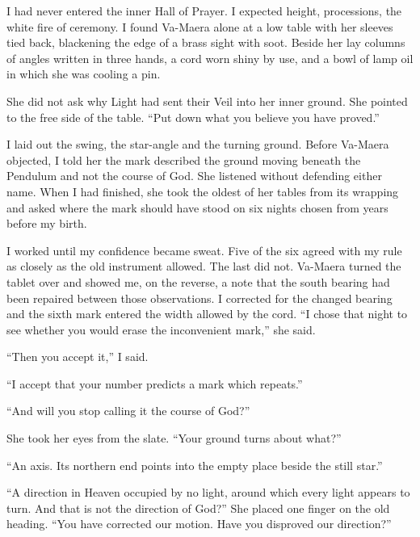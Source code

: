 I had never entered the inner Hall of Prayer. I expected height, processions, the white fire of ceremony. I found Va-Maera alone at a low table with her sleeves tied back, blackening the edge of a brass sight with soot. Beside her lay columns of angles written in three hands, a cord worn shiny by use, and a bowl of lamp oil in which she was cooling a pin.\par

She did not ask why Light had sent their Veil into her inner ground. She pointed to the free side of the table. ``Put down what you believe you have proved.''\par

I laid out the swing, the star-angle and the turning ground. Before Va-Maera objected, I told her the mark described the ground moving beneath the Pendulum and not the course of God. She listened without defending either name. When I had finished, she took the oldest of her tables from its wrapping and asked where the mark should have stood on six nights chosen from years before my birth.\par

I worked until my confidence became sweat. Five of the six agreed with my rule as closely as the old instrument allowed. The last did not. Va-Maera turned the tablet over and showed me, on the reverse, a note that the south bearing had been repaired between those observations. I corrected for the changed bearing and the sixth mark entered the width allowed by the cord. ``I chose that night to see whether you would erase the inconvenient mark,'' she said.\par

``Then you accept it,'' I said.\par

``I accept that your number predicts a mark which repeats.''\par

``And will you stop calling it the course of God?''\par

She took her eyes from the slate. ``Your ground turns about what?''\par

``An axis. Its northern end points into the empty place beside the still star.''\par

``A direction in Heaven occupied by no light, around which every light appears to turn. And that is not the direction of God?'' She placed one finger on the old heading. ``You have corrected our motion. Have you disproved our direction?''\par

